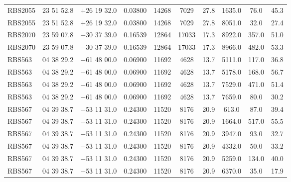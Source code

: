 \begin{landscape}
\begin{center}
\begin{longtable}{l c c c c c c c c c}
RBS2055  &                 23 51 52.8  &         $+$26 19 32.0  &       0.03800  & 14268  &   7029  &       27.8  &      1635.0  &  76.0  &   45.3  \\
RBS2055  &                 23 51 52.8  &         $+$26 19 32.0  &       0.03800  & 14268  &   7029  &       27.8  &      8051.0  &  32.0  &   27.4  \\
RBS2070  &                 23 59 07.8  &         $-$30 37 39.0  &       0.16539  & 12864  &   17033  &      17.3  &      8922.0  &  357.0  &  51.0  \\
RBS2070  &                 23 59 07.8  &         $-$30 37 39.0  &       0.16539  & 12864  &   17033  &      17.3  &      8966.0  &  482.0  &  53.3  \\
RBS563  &                  04 38 29.2  &         $-$61 48 00.0  &       0.06900  & 11692  &   4628  &       13.7  &      5111.0  &  117.0  &  36.8  \\
RBS563  &                  04 38 29.2  &         $-$61 48 00.0  &       0.06900  & 11692  &   4628  &       13.7  &      5178.0  &  168.0  &  56.7  \\
RBS563  &                  04 38 29.2  &         $-$61 48 00.0  &       0.06900  & 11692  &   4628  &       13.7  &      7529.0  &  471.0  &  51.4  \\
RBS563  &                  04 38 29.2  &         $-$61 48 00.0  &       0.06900  & 11692  &   4628  &       13.7  &      7659.0  &  80.0  &   30.2  \\
RBS567  &                  04 39 38.7  &         $-$53 11 31.0  &       0.24300  & 11520  &   8176  &       20.9  &      613.0  &   87.0  &   39.4  \\
RBS567  &                  04 39 38.7  &         $-$53 11 31.0  &       0.24300  & 11520  &   8176  &       20.9  &      1664.0  &  517.0  &  55.5  \\
RBS567  &                  04 39 38.7  &         $-$53 11 31.0  &       0.24300  & 11520  &   8176  &       20.9  &      3947.0  &  93.0  &   32.7  \\
RBS567  &                  04 39 38.7  &         $-$53 11 31.0  &       0.24300  & 11520  &   8176  &       20.9  &      4332.0  &  50.0  &   33.2  \\
RBS567  &                  04 39 38.7  &         $-$53 11 31.0  &       0.24300  & 11520  &   8176  &       20.9  &      5259.0  &  134.0  &  40.0  \\
RBS567  &                  04 39 38.7  &         $-$53 11 31.0  &       0.24300  & 11520  &   8176  &       20.9  &      6370.0  &  35.0  &   17.9  \\

\end{longtable}
\end{center}
\end{landscape}
